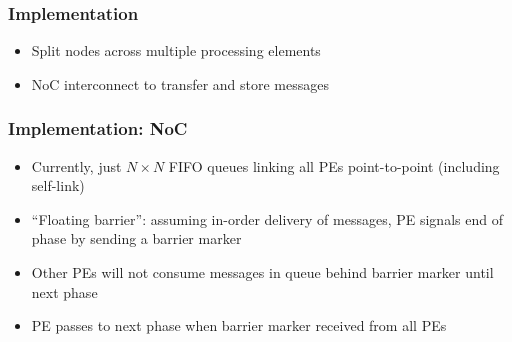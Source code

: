 \documentclass[14pt]{beamer}
\begin{document}
\begin{frame}
	\frametitle{Implementation}
	\begin{itemize}
		\addtolength{\itemsep}{0.5\baselineskip}
		\item Split nodes across multiple processing elements
		\item NoC interconnect to transfer and store messages
		\end{itemize}
\end{frame}

\begin{frame}
	\frametitle{Implementation: NoC}
	\begin{itemize}
		\addtolength{\itemsep}{0.5\baselineskip}
		\item Currently, just $N \times N$ FIFO queues linking all PEs point-to-point (including self-link)
		\item ``Floating barrier'': assuming in-order delivery of messages, PE signals end of phase by sending a barrier marker
		\item Other PEs will not consume messages in queue behind barrier marker until next phase
		\item PE passes to next phase when barrier marker received from all PEs
	\end{itemize}
\end{frame}
\end{document}
